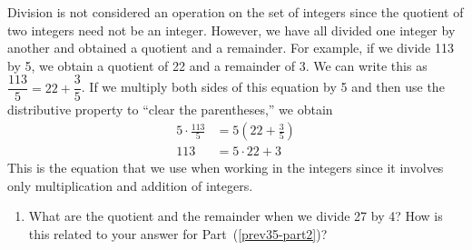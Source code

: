 \begin{previewactivity}\label{PA:quotients} \hfill
{}

Division is not considered an operation on the set of integers since the quotient of two integers need not be an integer.  However, we have all divided one integer by another and obtained a quotient and a remainder.  For example, if we divide 113 by 5, we obtain a quotient of 22 and a remainder of 3.  We can write this as $\dfrac{113}{5} = 22 + \dfrac{3}{5}$.  If we multiply both sides of this equation by 5 and then use the distributive property to ``clear the parentheses,'' we obtain
\begin{align*}
5 \cdot \frac{113}{5} &= 5 \left( 22 + \frac{3}{5} \right) \\
                113   &= 5 \cdot 22 + 3
\end{align*}
This is the equation that we use when working in the integers since it involves only multiplication and addition of integers.
\setcounter{oldenumi}{\theenumi}
\begin{enumerate} \setcounter{enumi}{\theoldenumi}
\item What are the quotient and the remainder when we divide  27  by  4?  How is this related to your answer for Part~(\ref{prev35-part2})?


\end{enumerate}
\end{previewactivity}
